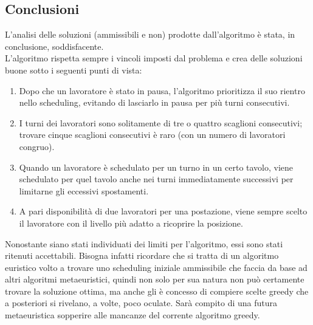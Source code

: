 \subsection{Conclusioni}
L'analisi delle soluzioni (ammissibili e non) prodotte dall'algoritmo è stata, in conclusione, soddisfacente. \\
L'algoritmo rispetta sempre i vincoli imposti dal problema e crea delle soluzioni buone sotto i seguenti punti di vista:
\begin{enumerate}
    \item Dopo che un lavoratore è stato in pausa, l'algoritmo prioritizza il suo rientro nello scheduling, evitando di lasciarlo in pausa per più turni consecutivi.
    \item I turni dei lavoratori sono solitamente di tre o quattro scaglioni consecutivi; trovare cinque scaglioni consecutivi è raro (con un numero di lavoratori congruo).
    \item Quando un lavoratore è schedulato per un turno in un certo tavolo, viene schedulato per quel tavolo anche nei turni immediatamente successivi per limitarne gli eccessivi spostamenti.
    \item A pari disponibilità di due lavoratori per una postazione, viene sempre scelto il lavoratore con il livello più adatto a ricoprire la posizione.
\end{enumerate}
Nonostante siano stati individuati dei limiti per l'algoritmo, essi sono stati ritenuti accettabili. Bisogna infatti ricordare che si tratta di un algoritmo euristico volto a trovare uno scheduling iniziale ammissibile che faccia da base ad altri algoritmi metaeuristici, quindi non solo per sua natura non può certamente trovare la soluzione ottima, ma anche gli è concesso di compiere scelte greedy che a posteriori si rivelano, a volte, poco oculate. Sarà compito di una futura metaeuristica sopperire alle mancanze del corrente algoritmo greedy.